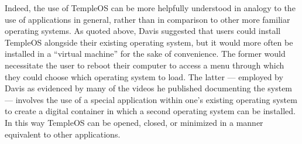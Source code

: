 \documentclass[Draft.tex]{subfiles}
\begin{document}

Indeed, the use of TempleOS can be more helpfully understood in
analogy to the use of applications in general, rather than
in comparison to other more familiar operating systems.
As quoted above, Davis suggested that users could install TempleOS
alongside their existing operating system, but it would more often
be installed in a ``virtual machine'' for the sake of convenience.
The former would necessitate the user to reboot their computer
to access a menu through which they could choose which operating system to
load.
The latter --- employed by Davis as evidenced by many of the
videos he published documenting the system --- involves the use of a special
application within one's existing operating system to create a digital container
in which a second operating system can be installed.
In this way TempleOS can be opened, closed, or minimized in a manner
equivalent to other applications.
\end{document}
